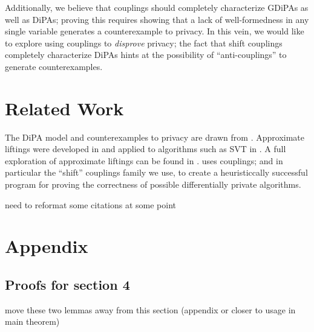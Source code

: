 \documentclass[12pt]{article}
\theoremstyle{definition}
\begin{document}
Additionally, we believe that couplings should completely characterize GDiPAs as well as DiPAs; proving this requires showing that a lack of well-formedness in any single variable generates a counterexample to privacy. 
In this vein, we would like to explore using couplings to \textit{disprove} privacy; the fact that shift couplings completely characterize DiPAs hints at the possibility of ``anti-couplings'' to generate counterexamples.

\section{Related Work}
The DiPA model and counterexamples to privacy are drawn from \cite{chadhaLinearTimeDecidability2021}. Approximate liftings were developed in \cite{bartheKopfOlmedo2012ProbabilisticRelationalReasoningforDifferentialPriv,BartheOlmedo2013} and applied to algorithms such as SVT in \cite{BartheEtAl2016}.
A full exploration of approximate liftings can be found in \cite{HsuThesis2017}. \cite{AlbarghouthiHsu2018} uses couplings; and in particular the ``shift'' couplings family we use, to create a heuristiccally successful program for proving the correctness of possible differentially private algorithms. 


{\color{red} need to reformat some citations at some point}



\section{Appendix}

\subsection{Proofs for section 4}

{\color{red} move these two lemmas away from this section (appendix or closer to usage in main theorem)}
\end{document}
